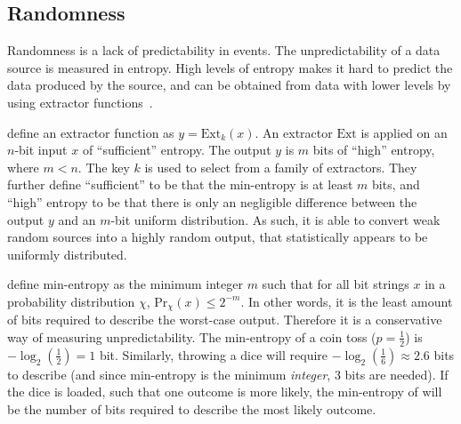 \subsection{Randomness}

Randomness is a lack of predictability in events.
The unpredictability of a data source is measured in entropy.
High levels of entropy makes it hard to predict the data produced by the source, and can be obtained from data with lower levels by using extractor functions~\cite{pseudorandomness}.

\citet{bonneau2015bitcoin} define an extractor function as $y = \text{Ext}_k(x)$.
An extractor $\text{Ext}$ is applied on an $n$-bit input $x$ of \enquote{sufficient} entropy.
The output $y$ is $m$ bits of \enquote{high} entropy, where $m < n$. The key $k$ is used to select from a family of extractors.
They further define \enquote{sufficient} to be that the min-entropy is at least $m$ bits, and \enquote{high} entropy to be that there is only an negligible difference between the output $y$ and an $m$-bit uniform distribution.
As such, it is able to convert weak random sources into a highly random output, that statistically appears to be uniformly distributed.


\citet{dodis2004randomness} define min-entropy as the minimum integer $m$ such that for all bit strings $x$ in a probability distribution $\chi$, $\text{Pr}_\chi(x) \leq 2^{-m}$.
In other words, it is the least amount of bits required to describe the worst-case output.
Therefore it is a conservative way of measuring unpredictability.
The min-entropy of a coin toss ($p = \frac{1}{2}$) is $-\log_2(\frac{1}{2}) = 1$ bit. Similarly, throwing a dice will require $-\log_2(\frac{1}{6}) \approx 2.6$ bits to describe (and since min-entropy is the minimum \emph{integer}, 3 bits are needed).
If the dice is loaded, such that one outcome is more likely, the min-entropy of will be the number of bits required to describe the most likely outcome.

